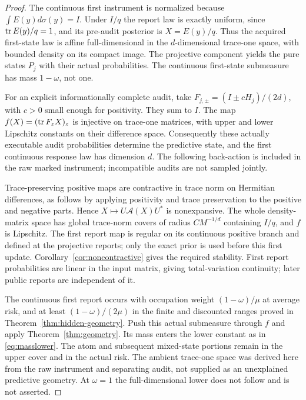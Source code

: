 \begin{proof}
The continuous first instrument is normalized because $\int E(y)d\sigma(y)=I$. Under $I/q$ the report law is exactly uniform, since $\operatorname{tr} E(y)/q=1$, and its pre-audit posterior is $X=E(y)/q$. Thus the acquired first-state law is affine full-dimensional in the $d$-dimensional trace-one space, with bounded density on its compact image. The projective component yields the pure states $P_j$ with their actual probabilities. The continuous first-state submeasure has mass $1-\omega$, not one.

For an explicit informationally complete audit, take $F_{j,\pm}=(I\pm cH_j)/(2d)$, with $c>0$ small enough for positivity. They sum to $I$. The map $f(X)=(\operatorname{tr} F_zX)_z$ is injective on trace-one matrices, with upper and lower Lipschitz constants on their difference space. Consequently these actually executable audit probabilities determine the predictive state, and the first continuous response law has dimension $d$. The following back-action is included in the raw marked instrument; incompatible audits are not sampled jointly.

Trace-preserving positive maps are contractive in trace norm on Hermitian differences, as follows by applying positivity and trace preservation to the positive and negative parts. Hence $X\mapsto U\mathcal A(X)U^*$ is nonexpansive. The whole density-matrix space has global trace-norm covers of radius $C M^{-1/d}$ containing $I/q$, and $f$ is Lipschitz. The first report map is regular on its continuous positive branch and defined at the projective reports; only the exact prior is used before this first update. Corollary~\ref{cor:noncontractive} gives the required stability. First report probabilities are linear in the input matrix, giving total-variation continuity; later public reports are independent of it.

The continuous first report occurs with occupation weight $(1-\omega)/\mu$ at average risk, and at least $(1-\omega)/(2\mu)$ in the finite and discounted ranges proved in Theorem~\ref{thm:hidden-geometry}. Push this actual submeasure through $f$ and apply Theorem~\ref{thm:geometry}. Its mass enters the lower constant as in \eqref{eq:masslower}. The atom and subsequent mixed-state portions remain in the upper cover and in the actual risk. The ambient trace-one space was derived here from the raw instrument and separating audit, not supplied as an unexplained predictive geometry. At $\omega=1$ the full-dimensional lower does not follow and is not asserted.
\end{proof}

